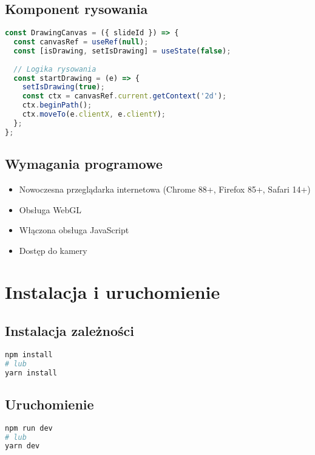 \documentclass[12pt,a4paper]{article}
\begin{document}
\subsection{Komponent rysowania}
\begin{lstlisting}[language=JavaScript]
const DrawingCanvas = ({ slideId }) => {
  const canvasRef = useRef(null);
  const [isDrawing, setIsDrawing] = useState(false);
  
  // Logika rysowania
  const startDrawing = (e) => {
    setIsDrawing(true);
    const ctx = canvasRef.current.getContext('2d');
    ctx.beginPath();
    ctx.moveTo(e.clientX, e.clientY);
  };
};
\end{lstlisting}

\subsection{Wymagania programowe}
\begin{itemize}
    \item Nowoczesna przeglądarka internetowa (Chrome 88+, Firefox 85+, Safari 14+)
    \item Obsługa WebGL
    \item Włączona obsługa JavaScript
    \item Dostęp do kamery
\end{itemize}

\section{Instalacja i uruchomienie}
\subsection{Instalacja zależności}
\begin{lstlisting}[language=bash]
npm install
# lub
yarn install
\end{lstlisting}

\subsection{Uruchomienie}
\begin{lstlisting}[language=bash]
npm run dev
# lub
yarn dev
\end{lstlisting}
\end{document}
